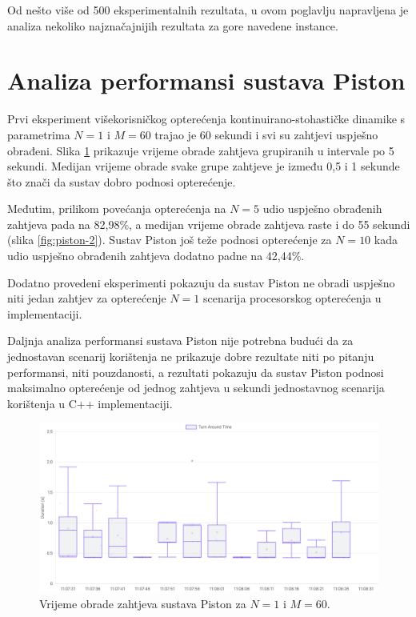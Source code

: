 \documentclass[times, utf8, diplomski]{fer}
\begin{document}
Od nešto više od 500 eksperimentalnih rezultata, u ovom poglavlju napravljena je analiza nekoliko najznačajnijih rezultata za gore navedene instance.

\section{Analiza performansi sustava Piston}
Prvi eksperiment višekorisničkog opterećenja kontinuirano-stohastičke dinamike s parametrima $N=1$ i $M=60$ trajao je 60 sekundi i svi su zahtjevi uspješno obrađeni. Slika \ref{fig:piston-1} prikazuje vrijeme obrade zahtjeva grupiranih u intervale po 5 sekundi. Medijan vrijeme obrade svake grupe zahtjeve je između 0,5 i 1 sekunde što znači da sustav dobro podnosi opterećenje. 

Međutim, prilikom povećanja opterećenja na $N=5$ udio uspješno obrađenih zahtjeva pada na 82,98\%, a medijan vrijeme obrade zahtjeva raste i do 55 sekundi (slika \ref{fig:piston-2}). Sustav Piston još teže podnosi opterećenje za $N=10$ kada udio uspješno obrađenih zahtjeva dodatno padne na 42,44\%.

Dodatno provedeni eksperimenti pokazuju da sustav Piston ne obradi uspješno niti jedan zahtjev za opterećenje $N=1$ scenarija procesorskog opterećenja u  implementaciji.

Daljnja analiza performansi sustava Piston nije potrebna budući da za jednostavan scenarij korištenja ne prikazuje dobre rezultate niti po pitanju performansi, niti pouzdanosti, a rezultati pokazuju da sustav Piston podnosi maksimalno opterećenje od jednog zahtjeva u sekundi jednostavnog scenarija korištenja u C++ implementaciji.

\begin{figure}[htb]
	\centering
	\includegraphics[width=\textwidth]{images/Piston TAT for 1 5s.png}
	\caption{
		Vrijeme obrade zahtjeva sustava Piston za $N=1$ i $M=60$.
	}
	\label{fig:piston-1}
\end{figure}
\end{document}
